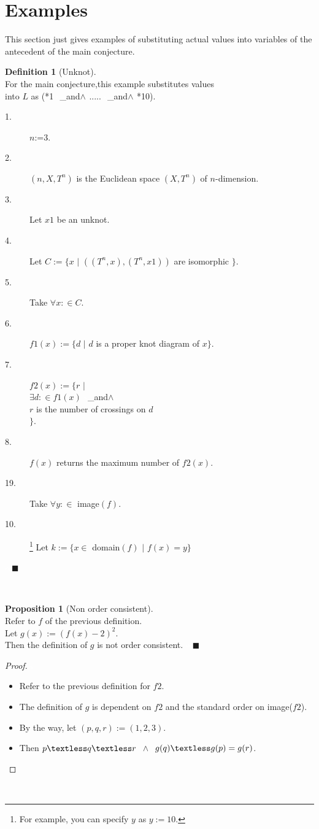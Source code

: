 \newqed\documentclass{article}
\theoremstyle{definition}
\newtheorem{definition}{Definition}[section]
\newtheorem{proposition}{Proposition}
\newcommand{\newspc}{\textcolor{white}{s}}
\newcommand{\newqed}{\newspc{\hfill\color{ocre}\ensuremath{\blacksquare}}}
\newcommand{\newland}{\newspc_{and}$\land$\newspc}
\begin{document}
\section{Examples}
This section just gives examples of substituting actual values into variables of the antecedent of the main conjecture.
\\
\begin{definition}[Unknot]
\newspc\\For the main conjecture,this example substitutes values 
\\into $L$ as (*1 \newland ..... \newland *10).
\begin{description}
\item[1.] $n$:=3.
\item[2.] $(n,X,T^n)$ is the Euclidean space $(X,T^n)$ of $n$-dimension.
\item[3.] Let $x1$ be an unknot.
\item[4.] Let $C:=\{x$ $|$ $((T^n,x),(T^n,x1))$ are isomorphic $\}$.
\item[5.] Take $\forall x:\in C$.
\item[6.] $f1(x):=\{d$ $|$ $d$ is a proper knot diagram of $x\}$.
\item[7.] $f2(x):=\{r$ $|$ 
\\$\exists d:\in f1(x)$ \newland 
\\$r$ is the number of crossings on $d$
\\$\}$.
\item[8.] $f(x)$ returns the maximum number of $f2(x)$.
\item[19.] Take $\forall y:\in$ image$(f)$. 
\item[10.] \footnote{For example, you can specify $y$ as $y:=10$.}
Let $k:=\{x\in$ domain$(f)$ $|$ $f(x)=y \}$
\end{description}
\newspc\newqed
\end{definition}
\\
\begin{proposition}[Non order consistent]
\newspc\\Refer to $f$ of the previous definition. 
\\Let $g(x):=(f(x)-2)^2$. 
\\Then the definition of $g$ is not order consistent. 
\newspc\newqed
\end{proposition}
\begin{proof}
\newspc
\begin{itemize}
    \item Refer to the previous definition for $f2$.
    \item The definition of $g$ is dependent on $f2$ and the standard order on image($f2$).
    \item By the way, let $(p,q,r):=(1,2,3)$. 
    \item Then $p \textless q \textless r$ \newspc $\land$ \newspc $g(q) \textless g(p)=g(r)$.
    
\end{itemize}
\end{proof}
\\
\end{document}
